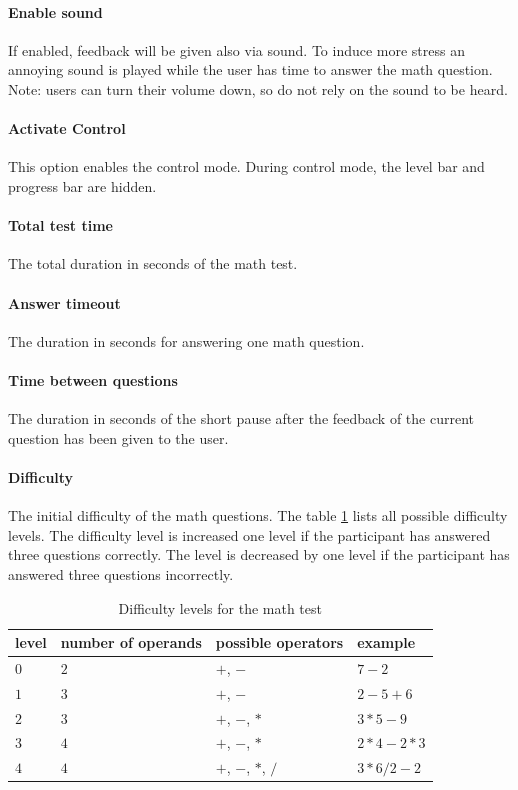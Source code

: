 \paragraph{Enable sound}
If enabled, feedback will be given also via sound. 
To induce more stress an annoying sound is played while the user has time to answer the math question.
Note: users can turn their volume down, so do not rely on the sound to be heard.

\paragraph{Activate Control}
This option enables the control mode.
During control mode, the level bar and progress bar are hidden.

\paragraph{Total test time}
The total duration in seconds of the math test.

\paragraph{Answer timeout}
The duration in seconds for answering one math question.

\paragraph{Time between questions}
The duration in seconds of the short pause after the feedback of the current question has been given to the user.

\paragraph{Difficulty}
The initial difficulty of the math questions.
The table \ref{tab:math-test-difficulty} lists all possible difficulty levels.
The difficulty level is increased one level if the participant has answered three questions correctly.
The level is decreased by one level if the participant has answered three questions incorrectly.

\begin{table}[ht]
  \begin{tabularx}{\textwidth}{l|l|l|l}
    level & number of operands & possible operators & example \\
    \hline
    $0$ & $2$ & $+$, $-$ & $7-2$ \\
    $1$ & $3$ & $+$, $-$ & $2-5+6$ \\
    $2$ & $3$ & $+$, $-$, $*$ & $3*5-9$ \\
    $3$ & $4$ & $+$, $-$, $*$ & $2*4-2*3$ \\
    $4$ & $4$ & $+$, $-$, $*$, $/$ & $3*6/2-2$ \\
  \end{tabularx}
  \caption{Difficulty levels for the math test}
  \label{tab:math-test-difficulty}
\end{table}

